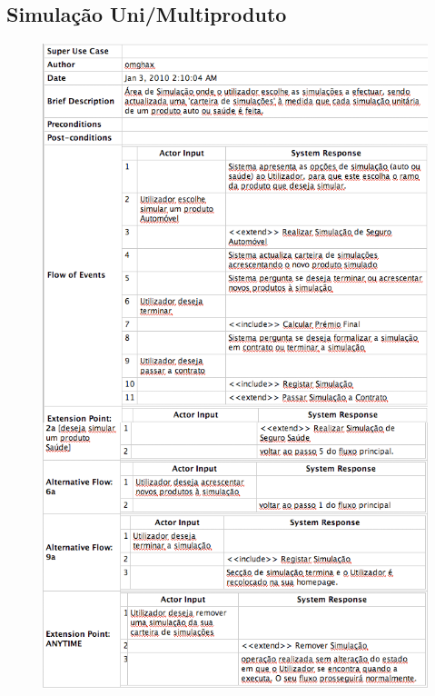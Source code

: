 \subsection{Simulação Uni/Multiproduto}
\begin{figure}[!htb]
	\centering
	\includegraphics[scale=0.53]{images/Prints/Simulador/SimulacaoUniMultiproduto.png}
\end{figure}

\pagebreak

